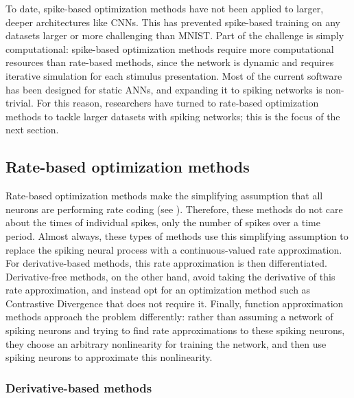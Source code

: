 To date, spike-based optimization methods have not been applied
to larger, deeper architectures like CNNs.
This has prevented spike-based training on any datasets
larger or more challenging than MNIST.
Part of the challenge is simply computational:
spike-based optimization methods require more computational resources
than rate-based methods,
since the network is dynamic and requires iterative simulation
for each stimulus presentation.
Most of the current software has been designed for static ANNs,
and expanding it to spiking networks is non-trivial.
For this reason,
researchers have turned to rate-based optimization methods
to tackle larger datasets with spiking networks;
this is the focus of the next section.


\subsection{Rate-based optimization methods}

Rate-based optimization methods make the simplifying assumption
that all neurons are performing rate coding (see ).
Therefore, these methods do not care about the times of individual spikes,
only the number of spikes over a time period.
Almost always, these types of methods use this simplifying assumption
to replace the spiking neural process with a continuous-valued rate approximation.
For derivative-based methods, this rate approximation is then differentiated.
Derivative-free methods, on the other hand, avoid taking the derivative
of this rate approximation,
and instead opt for an optimization method such as Contrastive Divergence
that does not require it.
Finally, function approximation methods approach the problem differently:
rather than assuming a network of spiking neurons and trying to find
rate approximations to these spiking neurons,
they choose an arbitrary nonlinearity for training the network,
and then use spiking neurons to approximate this nonlinearity.


\subsubsection{Derivative-based methods}

